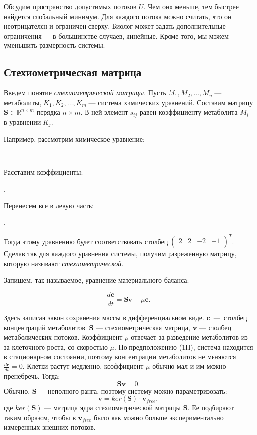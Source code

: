 \documentclass[14pt, a4paper]{extreport}
\begin{document}
Обсудим пространство допустимых потоков $U$. Чем оно меньше, тем быстрее найдется глобальный минимум. Для каждого потока можно считать, что он неотрицателен и ограничен сверху. Биолог может задать дополнительные ограничения --- в большинстве случаев, линейные. Кроме того, мы можем уменьшить размерность системы.

\subsection{Стехиометрическая матрица}

Введем понятие \emph{стехиометрической матрицы}. Пусть $M_1, M_2, \dots, M_n$ --- метаболиты, $K_1, K_2, \dots, K_m$ --- система химических уравнений. 
Составим матрицу $\mathbf{S} \in \mathbb{R}^{n \times m}$ порядка $n \times m$. В ней элемент $s_{ij}$ равен коэффициенту метаболита $M_i$ в уравнении $K_j$.

Например, рассмотрим химическое уравнение:

\begin{center}
	.
\end{center}

Расставим коэффициенты:

\begin{center}
	.
\end{center}

Перенесем все в левую часть:

\begin{center}
	.
\end{center}
Тогда этому уравнению будет соответствовать столбец $\begin{pmatrix}
2 & 2 & -2 & -1\\
\end{pmatrix}^T$. Сделав так для каждого уравнения системы, получим разреженную матрицу, которую называют \emph{стехиометрической}.

Запишем, так называемое, уравнение материального баланса:

$$\frac{d\textbf{c}}{dt} = \textbf{Sv} - \mu{}\textbf{c}.$$

Здесь записан закон сохранения массы в дифференциальном виде. $\textbf{c}$~---~столбец концентраций метаболитов, $\textbf{S}$ --- стехиометрическая матрица, $\textbf{v}$ --- столбец метаболических потоков. Коэффициент $\mu$ отвечает за разведение метаболитов из-за клеточного роста, со скоростью $\mu$. По предположению (1П), система находится в стационарном состоянии, поэтому концентрации метаболитов не меняются $\frac{d\textbf{c}}{dt} = 0$. Клетки растут медленно, коэффициент $\mu$ обычно мал и им можно пренебречь. Тогда:
$$ \textbf{Sv} = 0.$$
Обычно, $\mathbf{S}$ --- неполного ранга, поэтому систему можно параметризовать:
$$ \mathbf{v} = ker(\mathbf{S}) \cdot \mathbf{v}_{free},$$
где $ker(\textbf{S})$ --- матрица ядра стехиометрической матрицы $\mathbf{S}$. Ее подбирают таким образом, чтобы в $\mathbf{v}_{free}$ было как можно больше экспериментально измеренных внешних потоков.
\end{document}

